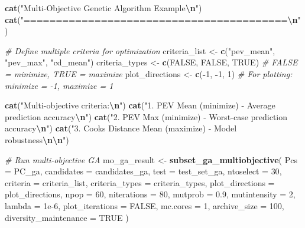 \documentclass[
]{article}
\newenvironment{Shaded}{\begin{snugshade}}{\end{snugshade}}
\newcommand{\AttributeTok}[1]{\textcolor[rgb]{0.13,0.29,0.53}{#1}}
\newcommand{\CommentTok}[1]{\textcolor[rgb]{0.56,0.35,0.01}{\textit{#1}}}
\newcommand{\ConstantTok}[1]{\textcolor[rgb]{0.56,0.35,0.01}{#1}}
\newcommand{\DecValTok}[1]{\textcolor[rgb]{0.00,0.00,0.81}{#1}}
\newcommand{\FloatTok}[1]{\textcolor[rgb]{0.00,0.00,0.81}{#1}}
\newcommand{\FunctionTok}[1]{\textcolor[rgb]{0.13,0.29,0.53}{\textbf{#1}}}
\newcommand{\NormalTok}[1]{#1}
\newcommand{\OtherTok}[1]{\textcolor[rgb]{0.56,0.35,0.01}{#1}}
\newcommand{\SpecialCharTok}[1]{\textcolor[rgb]{0.81,0.36,0.00}{\textbf{#1}}}
\newcommand{\StringTok}[1]{\textcolor[rgb]{0.31,0.60,0.02}{#1}}
\begin{document}
\begin{Shaded}
\begin{Highlighting}[]
\FunctionTok{cat}\NormalTok{(}\StringTok{"Multi{-}Objective Genetic Algorithm Example}\SpecialCharTok{\textbackslash{}n}\StringTok{"}\NormalTok{)}
\FunctionTok{cat}\NormalTok{(}\StringTok{"=========================================}\SpecialCharTok{\textbackslash{}n}\StringTok{"}\NormalTok{)}

\CommentTok{\# Define multiple criteria for optimization}
\NormalTok{criteria\_list }\OtherTok{\textless{}{-}} \FunctionTok{c}\NormalTok{(}\StringTok{"pev\_mean"}\NormalTok{, }\StringTok{"pev\_max"}\NormalTok{, }\StringTok{"cd\_mean"}\NormalTok{)}
\NormalTok{criteria\_types }\OtherTok{\textless{}{-}} \FunctionTok{c}\NormalTok{(}\ConstantTok{FALSE}\NormalTok{, }\ConstantTok{FALSE}\NormalTok{, }\ConstantTok{TRUE}\NormalTok{)  }\CommentTok{\# FALSE = minimize, TRUE = maximize}
\NormalTok{plot\_directions }\OtherTok{\textless{}{-}} \FunctionTok{c}\NormalTok{(}\SpecialCharTok{{-}}\DecValTok{1}\NormalTok{, }\SpecialCharTok{{-}}\DecValTok{1}\NormalTok{, }\DecValTok{1}\NormalTok{)  }\CommentTok{\# For plotting: minimize = {-}1, maximize = 1}

\FunctionTok{cat}\NormalTok{(}\StringTok{"Multi{-}objective criteria:}\SpecialCharTok{\textbackslash{}n}\StringTok{"}\NormalTok{)}
\FunctionTok{cat}\NormalTok{(}\StringTok{"1. PEV Mean (minimize) {-} Average prediction accuracy}\SpecialCharTok{\textbackslash{}n}\StringTok{"}\NormalTok{)}
\FunctionTok{cat}\NormalTok{(}\StringTok{"2. PEV Max (minimize) {-} Worst{-}case prediction accuracy}\SpecialCharTok{\textbackslash{}n}\StringTok{"}\NormalTok{) }
\FunctionTok{cat}\NormalTok{(}\StringTok{"3. Cook\textquotesingle{}s Distance Mean (maximize) {-} Model robustness}\SpecialCharTok{\textbackslash{}n\textbackslash{}n}\StringTok{"}\NormalTok{)}

\CommentTok{\# Run multi{-}objective GA}
\NormalTok{mo\_ga\_result }\OtherTok{\textless{}{-}} \FunctionTok{subset\_ga\_multiobjective}\NormalTok{(}
  \AttributeTok{Pcs =}\NormalTok{ PC\_ga,}
  \AttributeTok{candidates =}\NormalTok{ candidates\_ga,}
  \AttributeTok{test =}\NormalTok{ test\_set\_ga,}
  \AttributeTok{ntoselect =} \DecValTok{30}\NormalTok{,}
  \AttributeTok{criteria =}\NormalTok{ criteria\_list,}
  \AttributeTok{criteria\_types =}\NormalTok{ criteria\_types,}
  \AttributeTok{plot\_directions =}\NormalTok{ plot\_directions,}
  \AttributeTok{npop =} \DecValTok{60}\NormalTok{,}
  \AttributeTok{niterations =} \DecValTok{80}\NormalTok{,}
  \AttributeTok{mutprob =} \FloatTok{0.9}\NormalTok{,}
  \AttributeTok{mutintensity =} \DecValTok{2}\NormalTok{,}
  \AttributeTok{lambda =} \FloatTok{1e{-}6}\NormalTok{,}
  \AttributeTok{plot\_iterations =} \ConstantTok{FALSE}\NormalTok{,}
  \AttributeTok{mc.cores =} \DecValTok{1}\NormalTok{,}
  \AttributeTok{archive\_size =} \DecValTok{100}\NormalTok{,}
  \AttributeTok{diversity\_maintenance =} \ConstantTok{TRUE}
\NormalTok{)}


\end{Highlighting}
\end{Shaded}
\end{document}
